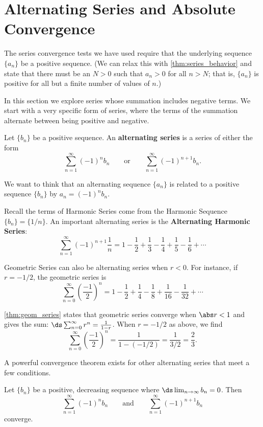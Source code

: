 \section{Alternating Series and Absolute Convergence}\label{sec:alt_series}

The series convergence tests we have used require that the underlying sequence $\{a_n\}$ be a positive sequence. (We can relax this with \autoref{thm:series_behavior} and state that there must be an $N>0$ such that $a_n>0$ for all $n>N$; that is, $\{a_n\}$ is positive for all but a finite number of values of $n$.)

In this section we explore series whose summation includes negative terms. We start with a very specific form of series, where the terms of the summation alternate between being positive and negative.

\begin{definition}\label{def:alt_series}
Let $\{b_n\}$ be a positive sequence. An \textbf{alternating series} is a series of either the form
\[
\sum_{n=1}^\infty (-1)^nb_n\qquad \text{or}\qquad \sum_{n=1}^\infty (-1)^{n+1}b_n.
\]
\end{definition}

We want to think that an alternating sequence $\{a_n\}$ is related to a positive sequence $\{b_n\}$ by $a_n=(-1)^n b_n$.

Recall the terms of Harmonic Series come from the Harmonic Sequence $\{b_n\} = \{1/n\}$. An important alternating series is the \textbf{Alternating Harmonic Series}:
\[
\sum_{n=1}^\infty (-1)^{n+1}\frac1n
= 1-\frac12+\frac13-\frac14+\frac15-\frac16+\dotsb
\]

Geometric Series can also be alternating series when $r<0$. For instance, if $r=-1/2$, the geometric series is
\[
\sum_{n=0}^\infty \left(\frac{-1}{2}\right)^n
= 1-\frac12+\frac14-\frac18+\frac1{16}-\frac1{32}+\dotsb
\]

\autoref{thm:geom_series} states that geometric series converge when $\abs r<1$ and gives the sum: $\ds \sum_{n=0}^\infty r^n = \frac1{1-r}$. When $r=-1/2$ as above, we find
\[
\sum_{n=0}^\infty\left(\frac{-1}{2}\right)^n=\frac1{1-(-1/2)}=\frac 1{3/2}=\frac23.
\]

A powerful convergence theorem exists for other alternating series that meet a few conditions.

\begin{theorem}\label{thm:alt_series_test}
Let $\{b_n\}$ be a positive, decreasing sequence where $\ds\lim_{n\to\infty}b_n=0$. Then
\[
\sum_{n=1}^\infty (-1)^{n}b_n \qquad \text{and}\qquad \sum_{n=1}^\infty (-1)^{n+1}b_n
\]
converge.
\end{theorem}

